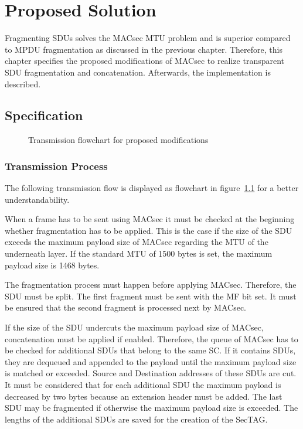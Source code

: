 \chapter{Proposed Solution}
\label{ch:proposal}
Fragmenting \glspl{SDU} solves the \gls{MACsec} \gls{MTU} problem and is superior compared to \gls{MPDU} fragmentation as discussed in the previous chapter.
Therefore, this chapter specifies the proposed modifications of \gls{MACsec} to realize transparent \gls{SDU} fragmentation and concatenation.
Afterwards, the implementation is described.

\section{Specification}
\begin{figure}
    \centering
    \resizebox{\columnwidth}{!}{
      
    }
    \caption[Transmission Flowchart]{Transmission flowchart for proposed modifications}
    \label{fig:fragmentation-flowchart}
\end{figure}
\subsection{Transmission Process}

The following transmission flow is displayed as flowchart in figure~\ref{fig:fragmentation-flowchart} for a better understandability.

When a frame has to be sent using \gls{MACsec} it must be checked at the beginning whether fragmentation has to be applied.
This is the case if the size of the \gls{SDU} exceeds the maximum payload size of \gls{MACsec} regarding the \gls{MTU} of the underneath layer.
If the standard \gls{MTU} of 1500 bytes is set, the maximum payload size is 1468 bytes.

The fragmentation process must happen before applying \gls{MACsec}.
Therefore, the \gls{SDU} must be split.
The first fragment must be sent with the \acrfull{MF} bit set.
It must be ensured that the second fragment is processed next by \gls{MACsec}.

If the size of the \gls{SDU} undercuts the maximum payload size of \gls{MACsec}, concatenation must be applied if enabled.
Therefore, the queue of \gls{MACsec} has to be checked for additional \glspl{SDU} that belong to the same \acrfull{SC}.
If it contains \glspl{SDU}, they are dequeued and appended to the payload until the maximum payload size is matched or exceeded.
Source and Destination addresses of these \glspl{SDU} are cut.
It must be considered that for each additional \gls{SDU} the maximum payload is decreased by two bytes because an extension header must be added.
The last \gls{SDU} may be fragmented if otherwise the maximum payload size is exceeded.
The lengths of the additional \glspl{SDU} are saved for the creation of the \gls{SecTAG}.


